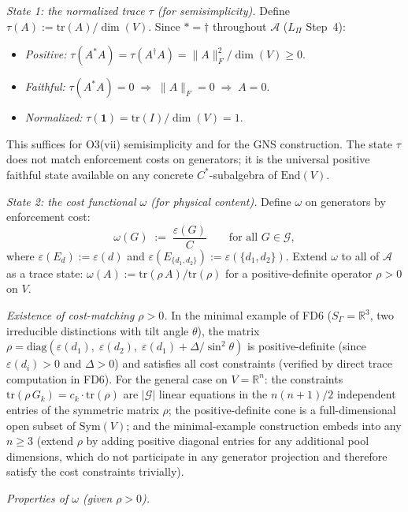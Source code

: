 \documentclass[11pt]{article}
\theoremstyle{remark}
\begin{document}
\smallskip\noindent\textit{State 1: the normalized trace $\tau$ (for semisimplicity).}  Define $\tau(A) := \mathrm{tr}(A)/\dim(V)$.  Since $* = \dagger$ throughout $\mathcal{A}$ ($L_\Pi$ Step~4):
\begin{itemize}[nosep,leftmargin=2em]
  \item \emph{Positive:} $\tau(A^*A) = \tau(A^\dagger A) = \|A\|_F^2/\dim(V) \ge 0$.
  \item \emph{Faithful:} $\tau(A^*A) = 0 \;\Rightarrow\; \|A\|_F = 0 \;\Rightarrow\; A = 0$.
  \item \emph{Normalized:} $\tau(\mathbf{1}) = \mathrm{tr}(I)/\dim(V) = 1$.
\end{itemize}
This suffices for O3(vii) semisimplicity and for the GNS construction.  The state $\tau$ does not match enforcement costs on generators; it is the universal positive faithful state available on any concrete $C^*$-subalgebra of $\mathrm{End}(V)$.

\smallskip\noindent\textit{State 2: the cost functional $\omega$ (for physical content).}  Define $\omega$ on generators by enforcement cost:
\[
\omega(G) \;:=\; \frac{\varepsilon(G)}{C} \qquad \text{for all } G \in \mathcal{G},
\]
where $\varepsilon(E_d) := \varepsilon(d)$ and $\varepsilon(E_{\{d_1,d_2\}}) := \varepsilon(\{d_1,d_2\})$.  Extend $\omega$ to all of $\mathcal{A}$ as a trace state: $\omega(A) := \mathrm{tr}(\rho\, A)/\mathrm{tr}(\rho)$ for a positive-definite operator $\rho > 0$ on $V$.

\smallskip\noindent\textit{Existence of cost-matching $\rho > 0$.}  In the minimal example of FD6 ($S_\Gamma = \mathbb{R}^3$, two irreducible distinctions with tilt angle $\theta$), the matrix $\rho = \mathrm{diag}(\varepsilon(d_1),\; \varepsilon(d_2),\; \varepsilon(d_1) + \Delta/\sin^2\!\theta)$ is positive-definite (since $\varepsilon(d_i) > 0$ and $\Delta > 0$) and satisfies all cost constraints (verified by direct trace computation in FD6).  For the general case on $V = \mathbb{R}^n$: the constraints $\mathrm{tr}(\rho\, G_k) = c_k \cdot \mathrm{tr}(\rho)$ are $|\mathcal{G}|$ linear equations in the $n(n{+}1)/2$ independent entries of the symmetric matrix $\rho$; the positive-definite cone is a full-dimensional open subset of $\mathrm{Sym}(V)$; and the minimal-example construction embeds into any $n \ge 3$ (extend $\rho$ by adding positive diagonal entries for any additional pool dimensions, which do not participate in any generator projection and therefore satisfy the cost constraints trivially).

\smallskip\noindent\textit{Properties of $\omega$ (given $\rho > 0$).}
\end{document}
